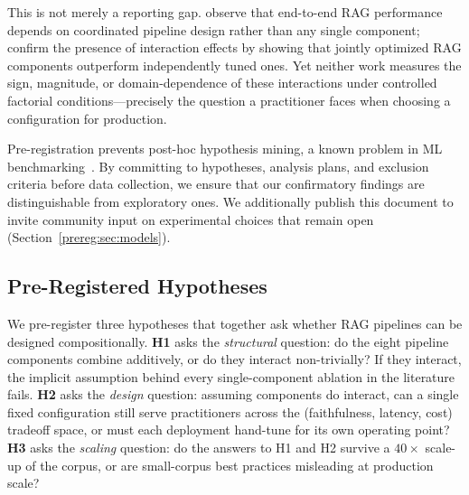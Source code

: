 This is not merely a reporting gap.
\citet{wang2024searching} observe that end-to-end RAG performance
depends on coordinated pipeline design rather than any single component;
\citet{chen2025mmoarag} confirm the presence of interaction effects by
showing that jointly optimized RAG components outperform independently
tuned ones.  Yet neither work measures the sign, magnitude, or
domain-dependence of these interactions under controlled factorial
conditions---precisely the question a practitioner faces when choosing a
configuration for production.

Pre-registration prevents post-hoc hypothesis mining, a known problem in
ML benchmarking~\citep{dodge2019importance,bouthillier2021accounting}.
By committing to hypotheses, analysis plans, and exclusion criteria
before data collection, we ensure that our confirmatory findings are
distinguishable from exploratory ones.  We additionally publish this
document to invite community input on experimental choices that remain
open (Section~\ref{prereg:sec:models}).

\subsection{Pre-Registered Hypotheses}
\label{prereg:sec:hypotheses}

We pre-register three hypotheses that together ask whether RAG
pipelines can be designed compositionally.  \textbf{H1} asks the
\emph{structural} question: do the eight pipeline components combine
additively, or do they interact non-trivially?  If they interact, the
implicit assumption behind every single-component ablation in the
literature fails.  \textbf{H2} asks the \emph{design} question:
assuming components do interact, can a single fixed configuration
still serve practitioners across the (faithfulness, latency, cost)
tradeoff space, or must each deployment hand-tune for its own
operating point?  \textbf{H3} asks the \emph{scaling} question: do the
answers to H1 and H2 survive a $40\times$ scale-up of the corpus, or
are small-corpus best practices misleading at production scale?

